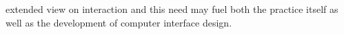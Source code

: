 extended view on interaction and this need may fuel both the practice itself as well as the development of computer interface design.



